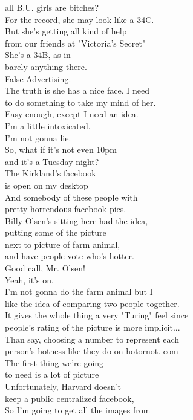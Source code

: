 \documentclass{article}
\begin{document}
\begin{multicols}{3}
all B.U. girls are bitches?\\
For the record, she may look like a 34C.\\
But she's getting all kind of help\\
from our friends at "Victoria's Secret"\\
She's a 34B, as in\\
barely anything there.\\
False Advertising.\\
The truth is she has a nice face. I need\\
to do something to take my mind of her.\\
Easy enough, except I need an idea.\\
I'm a little intoxicated.\\
I'm not gonna lie.\\
So, what if it's not even 10pm\\
and it's a Tuesday night?\\
The Kirkland's facebook\\
is open on my desktop\\
And somebody of these people with\\
pretty horrendous facebook pics.\\
Billy Olsen's sitting here had the idea,\\
putting some of the picture\\
next to picture of farm animal,\\
and have people vote who's hotter.\\
Good call, Mr. Olsen!\\
Yeah, it's on.\\
I'm not gonna do the farm animal but I\\
like the idea of comparing two people together.\\
It gives the whole thing a very "Turing" feel since\\
people's rating of the picture is more implicit...\\
Than say, choosing a number to represent each\\
person's hotness like they do on hotornot. com\\
The first thing we're going\\
to need is a lot of picture\\
Unfortunately, Harvard doesn't\\
keep a public centralized facebook,\\
So I'm going to get all the images from\\

\end{multicols}
\end{document}

